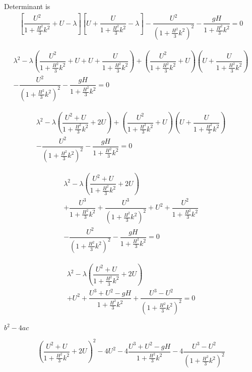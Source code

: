 \documentclass[12pt]{article}
\begin{document}
Determinant is
\begin{align}
\left[\dfrac{U^2}{1  + \frac{H^2}{3}k^2} + U  - \lambda\right]\left[U + \dfrac{ U}{1  + \frac{H^2}{3}k^2}  - \lambda \right] - \dfrac{ U^2}{\left(1  + \frac{H^2}{3}k^2\right)^2} - \dfrac{ gH}{1  + \frac{H^2}{3}k^2} = 0
\end{align}

\begin{align}
\lambda^2 - \lambda \left(\dfrac{U^2}{1  + \frac{H^2}{3}k^2} + U  + U + \dfrac{ U}{1  + \frac{H^2}{3}k^2}\right) + \left(\dfrac{U^2}{1  + \frac{H^2}{3}k^2} + U\right)\left(U + \dfrac{ U}{1  + \frac{H^2}{3}k^2}\right)\\ - \dfrac{ U^2}{\left(1  + \frac{H^2}{3}k^2\right)^2} - \dfrac{ gH}{1  + \frac{H^2}{3}k^2} = 0
\end{align}

\begin{align}
\lambda^2 - \lambda \left(\dfrac{U^2 + U}{1  + \frac{H^2}{3}k^2} + 2U  \right) + \left(\dfrac{U^2}{1  + \frac{H^2}{3}k^2} + U\right)\left(U + \dfrac{ U}{1  + \frac{H^2}{3}k^2}\right)\\ - \dfrac{ U^2}{\left(1  + \frac{H^2}{3}k^2\right)^2} - \dfrac{ gH}{1  + \frac{H^2}{3}k^2} = 0
\end{align}

\begin{align}
\lambda^2 - \lambda \left(\dfrac{U^2 + U}{1  + \frac{H^2}{3}k^2} + 2U  \right) \\+ \dfrac{U^3}{1  + \frac{H^2}{3}k^2} + \dfrac{U^3}{\left(1  + \frac{H^2}{3}k^2\right)^2} + U^2 + \dfrac{U^2}{1  + \frac{H^2}{3}k^2} \\ - \dfrac{ U^2}{\left(1  + \frac{H^2}{3}k^2\right)^2} - \dfrac{ gH}{1  + \frac{H^2}{3}k^2} = 0
\end{align}

\begin{align}
\lambda^2 - \lambda \left(\dfrac{U^2 + U}{1  + \frac{H^2}{3}k^2} + 2U  \right) \\+ U^2 +  \dfrac{U^3 + U^2 - gH}{1  + \frac{H^2}{3}k^2} + \dfrac{U^3 - U^2}{\left(1  + \frac{H^2}{3}k^2\right)^2}  = 0
\end{align}

$b^2 - 4ac$

\begin{align}
\left(\dfrac{U^2 + U}{1  + \frac{H^2}{3}k^2} + 2U  \right)^2 -4 U^2 -4  \dfrac{U^3 + U^2 - gH}{1  + \frac{H^2}{3}k^2} - 4\dfrac{U^3 - U^2}{\left(1  + \frac{H^2}{3}k^2\right)^2} 
\end{align}
\end{document}
